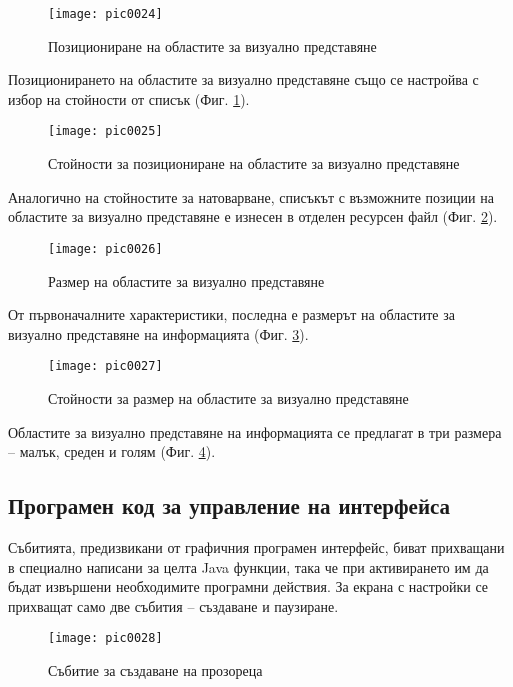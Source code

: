 \begin{figure}[h]
  \centering
  \texttt{[image: pic0024]}
  \caption{Позициониране на областите за визуално представяне}
\label{fig:pic0024}
\end{figure}
\FloatBarrier

Позиционирането на областите за визуално представяне също се настройва с избор на стойности от списък (Фиг. \ref{fig:pic0024}). 

\begin{figure}[h]
  \centering
  \texttt{[image: pic0025]}
  \caption{Стойности за позициониране на областите за визуално представяне}
\label{fig:pic0025}
\end{figure}
\FloatBarrier

Аналогично на стойностите за натоварване, списъкът с възможните позиции на областите за визуално представяне е изнесен в отделен ресурсен файл (Фиг. \ref{fig:pic0025}). 

\begin{figure}[h]
  \centering
  \texttt{[image: pic0026]}
  \caption{Размер на областите за визуално представяне}
\label{fig:pic0026}
\end{figure}
\FloatBarrier

От първоначалните характеристики, последна е размерът на областите за визуално представяне на информацията (Фиг. \ref{fig:pic0026}). 

\begin{figure}[h]
  \centering
  \texttt{[image: pic0027]}
  \caption{Стойности за размер на областите за визуално представяне}
\label{fig:pic0027}
\end{figure}
\FloatBarrier

Областите за визуално представяне на информацията се предлагат в три размера – малък, среден и голям (Фиг. \ref{fig:pic0027}).

\subsection{Програмен код за управление на интерфейса}

Събитията, предизвикани от графичния програмен интерфейс, биват прихващани в специално написани за целта Java функции, така че при активирането им да бъдат извършени необходимите програмни действия. За екрана с настройки се прихващат само две събития – създаване и паузиране. 

\begin{figure}[h]
  \centering
  \texttt{[image: pic0028]}
  \caption{Събитие за създаване на прозореца}
\label{fig:pic0028}
\end{figure}
\FloatBarrier

